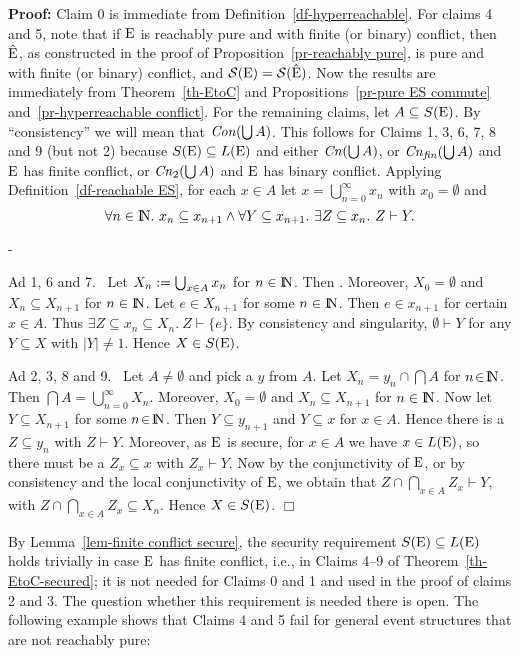 \documentclass[twocolumn]{article}
\newcommand{\df}[1]{Definition~\ref{df-#1}}
\newcommand{\thm}[1]{Theorem~\ref{th-#1}}
\newcommand{\pr}[1]{Proposition~\ref{pr-#1}}
\newcommand{\lem}[1]{Lemma~\ref{lem-#1}}
\newcommand{\turn}{\vdash}                              \newcommand{\dbigcup}{\bigcup_{\uparrow}}		\newcommand{\nbigcup}{\bigcup_{\bullet}}		\newcommand{\nbigcap}{\bigcap_{\bullet}}		\newcommand{\bbigcup}{\overline{\bigcup}}		\newcommand{\bbigcap}{\overline{\bigcap}}		\newcommand{\nbbigcap}{\bbigcap_{\bullet}}		\newcommand{\fbbigcup}{\overline{\bigcup}^f}		\newcommand{\bbbigcup}{\overline{\bigcup}^2}		\newcommand{\dcup}{~~\makebox[0pt]{\LARGE$\cdot$}\makebox[0pt]{$\cup$}~~}
\newcommand{\dl}[1]{\mbox{\rm I\hspace{-0.75mm}#1}}     \newcommand{\dc}[1]{\mbox{\rm {\raisebox{.4ex}{\makebox [0pt][l]{\hspace{.2em}\scriptsize $\mid$}}}#1}}
\newcommand{\IN}{\dl{N}}                        \newcommand{\IQ}{\dc{Q}}                        \newcommand{\IC}{\dc{C}}                        \newcommand{\IE}{\dl{E}}                        \newcommand{\IG}{\dc{G}}                        \newcommand{\fC}{{\cal C}}                      \newcommand{\fE}{{\cal E}}                      \newcommand{\fG}{{\cal G}}                      \newcommand{\fN}{{\cal N}}                      \newcommand{\fF}{{\cal F}}                      \newcommand{\fL}{{\cal L}}                      \newcommand{\fM}{{\cal M}}                      \newcommand{\fS}{{\cal S}}                      \newcommand{\fR}{{\cal R}}                      \newcommand{\eC}{{\rm C}}                       \newcommand{\eD}{{\rm D}}                       \newcommand{\eE}{{\rm E}}                       \newcommand{\eF}{{\rm F}}                       \newcommand{\eG}{{\rm G}}                       \newcommand{\eH}{{\rm H}}                       \newcommand{\eK}{{\rm K}}                       \newcommand{\eL}{{\rm L}}                       \newcommand{\eN}{{\rm N}}                       \newcommand{\eP}{{\rm P}}                       \newcommand{\eM}{{\rm M}}                       \newcommand{\eT}{{\rm T}}                       \newcommand{\fT}{{\cal T}}
\begin{document}
\begin{trivlist}
\item[\hspace{\labelsep}\bf Proof:]
Claim 0 is immediate from \df{hyperreachable}.
For claims 4 and 5, note that if $\eE$ is reachably pure and with finite (or
binary) conflict, then $\hat\eE$, as constructed in the proof of
\pr{reachably pure}, is pure and with finite (or binary) conflict, and
$\fS(\eE)=\fS(\hat\eE)$. Now the results are immediately from
\thm{EtoC} and Propositions~\ref{pr-pure ES commute} and~\ref{pr-hyperreachable conflict}.
For the remaining claims, let $A \subseteq S(\eE)$.
By ``consistency'' we will mean that ${\it Con}(\bigcup A)$.
This follows for Claims 1, 3, 6, 7, 8 and 9 (but not 2) because
$S(\eE) \subseteq L(\eE)$ and either ${\it Cn}(\bigcup A)$, or 
${\it Cn}_{\it fin}(\bigcup A)$ and $\eE$ has finite conflict, or 
${\it Cn}_2(\bigcup A)$ and $\eE$ has binary conflict.
Applying \df{reachable ES}, for each $x\in
A$ let $x = \bigcup_{n=0}^\infty x_n$ with $x_0 = \emptyset$ and
$$\forall n\in \IN.~ x_n \subseteq x_{n+1} \wedge \forall Y \subseteq
x_{n+1}.~ \exists Z \subseteq x_{n}.~ Z \turn Y.$$
\begin{list}{-}{\leftmargini\advance{}-
                \topsep 4pt \itemsep 2pt \parsep 2pt}
\item[Ad 1, 6 and 7.~] Let $X_n := \bigcup_{x\in A} x_n$ for $n\in \IN$.
Then .
Moreover, $X_0=\emptyset$ and $X_n \subseteq X_{n+1}$ for $n\in \IN$.
Let $e\in X_{n+1}$ for some $n\in\IN$. Then $e\in x_{n+1}$ for
certain $x\in A$. Thus $\exists Z \subseteq x_{n} \subseteq X_n.~ Z
\turn \{e\}$. By consistency and singularity, $\emptyset \turn Y$ for
any $Y\subseteq X$ with $|Y| \neq 1$. Hence $X\in S(\eE)$.
\item[Ad 2, 3, 8 and 9.~] Let $A\neq\emptyset$ and pick a $y$ from $A$.
Let $X_n = y_n \cap \bigcap A$ for $n\!\in\!\IN$. Then $\bigcap A =
\bigcup_{n=0}^\infty X_n$.  Moreover, $X_0=\emptyset$ and \mbox{$X_n
\subseteq X_{n+1}$} for $n\in \IN$.  Now let $Y \subseteq X_{n+1}$ for
some $n\!\in\!\IN$. Then $Y \subseteq y_{n+1}$ and $Y \subseteq x$ for
$x\!\in\!A$. Hence there is a $Z\subseteq y_n$ with $Z\turn Y$. Moreover,
as $\eE$ is secure, for $x\in A$ we have $x \in L(\eE)$, so there must
be a $Z_x \subseteq x$ with $Z_x \turn Y$. Now by the conjunctivity of
$\eE$, or by consistency and the local conjunctivity of $\eE$, we
obtain that $Z\cap\bigcap_{x\in A} Z_x \turn Y$, with
$Z\cap\bigcap_{x\in A} Z_x \subseteq X_n$.  Hence $X\in S(\eE)$.
\hfill$\Box$
\end{list}
\end{trivlist}
By \lem{finite conflict secure}, the security requirement
$S(\eE)\subseteq L(\eE)$ holds trivially in case $\eE$ has finite conflict,
i.e., in Claims 4--9 of \thm{EtoC-secured}; it is not needed for
Claims 0 and 1 and used in the proof of claims 2 and 3. The question
whether this requirement is needed there is open.
The following example shows that Claims 4 and 5 fail for general event
structures that are not reachably pure:
\end{document}
